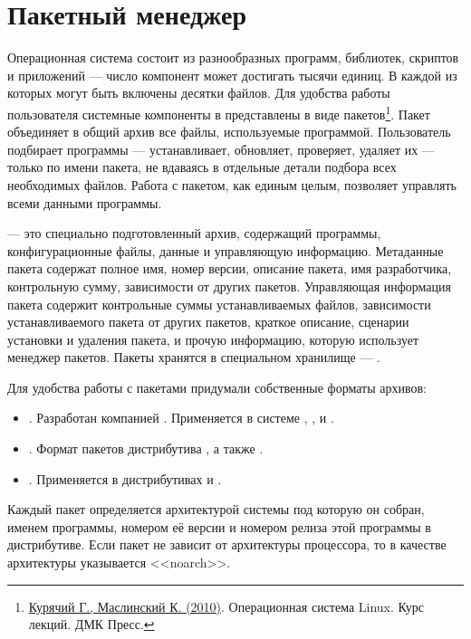 \chapter{Пакетный менеджер}\label{package-manager}
Операционная система состоит из разнообразных программ, библиотек, скриптов и приложений --- 
число компонент может достигать тысячи единиц. В каждой из которых могут быть включены десятки файлов. 
Для удобства работы пользователя системные компоненты в  представлены в виде 
пакетов\footnote{\href{https://docs.altlinux.org/books/altlibrary-linuxintro2.pdf}{Курячий Г., Маслинский К. (2010)}. 
Операционная система Linux. Курс лекций. ДМК Пресс.}. Пакет объединяет в общий архив все файлы, 
используемые программой. Пользователь подбирает программы --- устанавливает, обновляет, проверяет, 
удаляет их --- только по имени пакета, не вдаваясь в отдельные детали подбора всех необходимых файлов. 
Работа с пакетом, как единым целым, позволяет управлять всеми данными программы.

 --- это специально подготовленный архив, содержащий программы, конфигурационные файлы, 
данные и управляющую информацию. Метаданные пакета содержат полное имя, номер версии, описание пакета, 
имя разработчика, контрольную сумму, зависимости от других пакетов. Управляющая информация пакета содержит 
контрольные суммы устанавливаемых файлов, зависимости устанавливаемого пакета от других пакетов, 
краткое описание, сценарии установки и удаления пакета, и прочую информацию, которую использует 
менеджер пакетов. Пакеты хранятся в специальном хранилище --- .

Для удобства работы с пакетами придумали собственные форматы архивов:

\begin{itemize}
	\item {}. Разработан компанией . Применяется в системе , ,  и .
	\item {}. Формат пакетов дистрибутива , а также .
	\item {}. Применяется в дистрибутивах  и .
\end{itemize}

Каждый пакет определяется архитектурой системы под которую он собран, именем программы, 
номером её версии и номером релиза этой программы в дистрибутиве. Если пакет не зависит 
от архитектуры процессора, то в качестве архитектуры указывается <<noarch>>.

